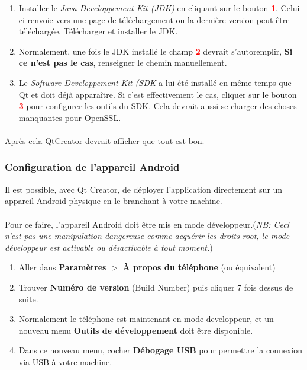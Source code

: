 \documentclass{article}
\begin{document}
\begin{enumerate}
    \item Installer le \textit{Java Developpement Kit (JDK)} en cliquant sur le bouton \textcolor{red}{\textbf{1}}. Celui-ci renvoie vers une page de téléchargement ou la dernière version peut être téléchargée. Télécharger et installer le JDK.
    \item Normalement, une fois le JDK installé le champ \textcolor{red}{\textbf{2}} devrait s'autoremplir, \textbf{Si ce n'est pas le cas}, renseigner le chemin manuellement.
    \item Le \textit{Software Developpement Kit (SDK} a lui été installé en même temps que Qt et doit déjà apparaître. Si c'est effectivement le cas, cliquer sur le bouton \textcolor{red}{\textbf{3}} pour configurer les outils du SDK. Cela devrait aussi se charger des choses manquantes pour OpenSSL.
\end{enumerate}

\paragraph{}
Après cela QtCreator devrait afficher que tout est bon.

\subsubsection{Configuration de l'appareil Android}
Il est possible, avec Qt Creator, de déployer l'application directement sur un appareil Android physique en le branchant à votre machine.

\paragraph{}
Pour ce faire, l'appareil Android doit être mis en mode développeur.(\textit{NB: Ceci n'est pas une manipulation dangereuse comme acquérir les droits root, le mode développeur est activable ou désactivable à tout moment.})

\begin{enumerate}
    \item Aller dans \textbf{Paramètres} $>$ \textbf{À propos du téléphone} (ou 
équivalent)
    \item Trouver \textbf{Numéro de version} (Build Number) puis cliquer 7 fois dessus de suite.
    \item Normalement le téléphone est maintenant en mode developpeur, et un nouveau menu \textbf{Outils de développement} doit être disponible.
    \item Dans ce nouveau menu, cocher \textbf{Débogage USB} pour permettre la connexion via USB à votre machine.
\end{enumerate}
\end{document}
